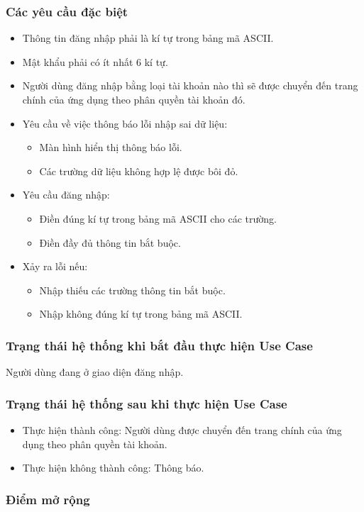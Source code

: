 \subsubsection{Các yêu cầu đặc biệt}
\begin{itemize}
    \item Thông tin đăng nhập phải là kí tự trong bảng mã ASCII.
    \item Mật khẩu phải có ít nhất 6 kí tự.
    \item Người dùng đăng nhập bằng loại tài khoản nào thì sẽ được chuyển đến trang chính của ứng dụng theo phân quyền tài khoản đó.
    \item Yêu cầu về việc thông báo lỗi nhập sai dữ liệu:
    \begin{itemize}
        \item Màn hình hiển thị thông báo lỗi.
        \item Các trường dữ liệu không hợp lệ được bôi đỏ.
    \end{itemize}
    \item Yêu cầu đăng nhập:
    \begin{itemize}
        \item Điền đúng kí tự trong bảng mã ASCII cho các trường.
        \item Điền đầy đủ thông tin bắt buộc.
    \end{itemize}
    \item Xảy ra lỗi nếu:
    \begin{itemize}
        \item Nhập thiếu các trường thông tin bắt buộc.
        \item Nhập không đúng kí tự trong bảng mã ASCII.
    \end{itemize}
\end{itemize}

\subsubsection{Trạng thái hệ thống khi bắt đầu thực hiện Use Case}
Người dùng đang ở giao diện đăng nhập.

\subsubsection{Trạng thái hệ thống sau khi thực hiện Use Case}
\begin{itemize}
    \item Thực hiện thành công: Người dùng được chuyển đến trang chính của ứng dụng theo phân quyền tài khoản.
    \item Thực hiện không thành công: Thông báo.
\end{itemize}

\subsubsection{Điểm mở rộng}